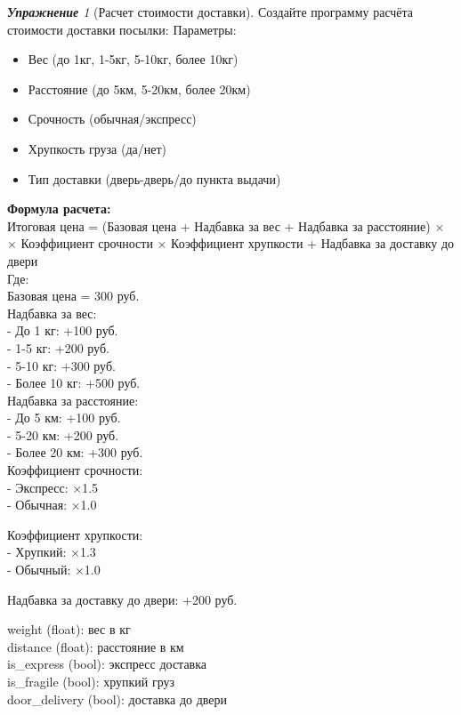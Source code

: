 \documentclass[a4,12pt]{article}
\theoremstyle{remark}
\newtheorem{exercise}{\textbf{Упражнение}}[section]
\begin{document}
    \begin{exercise}[Расчет стоимости доставки]
        Создайте программу расчёта стоимости доставки посылки:
    Параметры:
        \begin{itemize}
            \item Вес (до 1кг, 1-5кг, 5-10кг, более 10кг)
            \item Расстояние (до 5км, 5-20км, более 20км)
            \item Срочность (обычная/экспресс)
            \item Хрупкость груза (да/нет)
            \item Тип доставки (дверь-дверь/до пункта выдачи)
        \end{itemize}
        \textbf{Формула расчета:} \\
        
        {\small Итоговая цена = (Базовая цена + Надбавка за вес + Надбавка за расстояние) × \linebreak × 
                Коэффициент срочности × Коэффициент хрупкости + 
                Надбавка за доставку до двери} \\

Где: \\
Базовая цена = 300 руб. \\

Надбавка за вес: \\
- До 1 кг: +100 руб. \\
- 1-5 кг: +200 руб. \\
- 5-10 кг: +300 руб. \\
- Более 10 кг: +500 руб. \\

Надбавка за расстояние: \\
- До 5 км: +100 руб. \\
- 5-20 км: +200 руб. \\
- Более 20 км: +300 руб. \\

Коэффициент срочности: \\
- Экспресс: ×1.5 \\
- Обычная: ×1.0

Коэффициент хрупкости: \\
- Хрупкий: ×1.3 \\
- Обычный: ×1.0 

Надбавка за доставку до двери: +200 руб. 

        \begin{inputformat}[title=Входные данные]
            weight (float): вес в кг \\
            distance (float): расстояние в км \\
            is\_express (bool): экспресс доставка \\
            is\_fragile (bool): хрупкий груз \\
            door\_delivery (bool): доставка до двери \\
        \end{inputformat}
            

\end{exercise}
\end{document}
